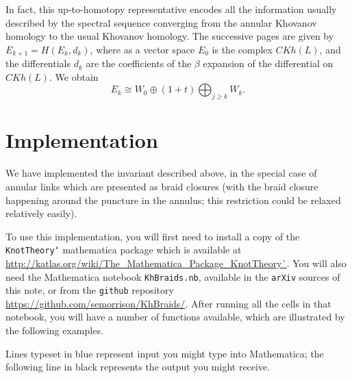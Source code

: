 \documentclass{amsart}
\theoremstyle{plain}
\begin{document}
In fact, this up-to-homotopy representative encodes all the information usually described by the spectral sequence converging from the annular Khovanov homology to the usual Khovanov homology. The successive pages are given by 
$E_{k+1} = H(E_k, d_k)$, where as a vector space $E_0$ is the complex $CKh(L)$, and the differentials $d_k$ are the coefficients of the $\beta$ expansion of the differential on $CKh(L)$. We obtain
$$E_k \cong W_0 \oplus (1+t) \bigoplus_{j \geq k} W_k.$$

\section{Implementation}
We have implemented the invariant described above, in the special case of annular links which are presented as braid closures (with the braid closure happening around the puncture in the annulus; this restriction could be relaxed relatively easily).

To use this implementation, you will first need to install a copy of the {\tt KnotTheory`} mathematica package which is available at \url{http://katlas.org/wiki/The_Mathematica_Package_KnotTheory`}. You will also need the Mathematica notebook {\tt KhBraids.nb}, available 
in the {\tt arXiv} sources of this note, or from
the {\tt github} repository \url{https://github.com/semorrison/KhBraids/}. After running all the cells in that notebook, you will have a number of functions available, which are illustrated by the following examples.

Lines typeset in blue represent input you might type into Mathematica; the following line in black represents the output you might receive.
\end{document}
